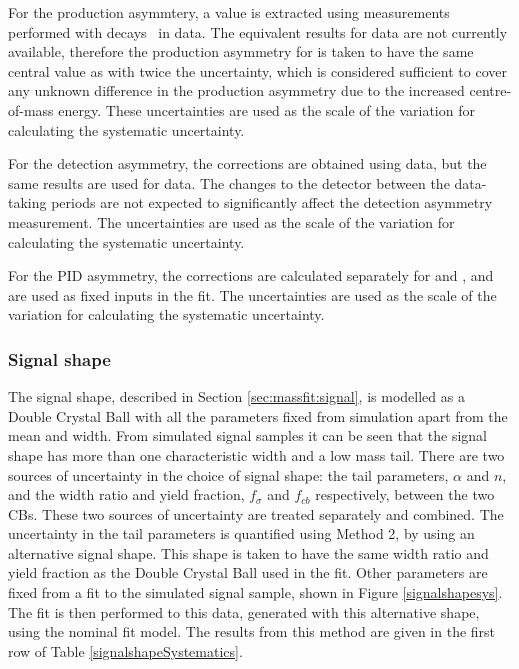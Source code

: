 For the production asymmtery, a \runone value is extracted using measurements performed with \decay{\Bp}{\Dzb\pip} decays~\cite{LHCb-PAPER-2016-054} in data. The equivalent results for \runtwo data are not currently available, therefore the production asymmetry for \runtwo is taken to have the same central value as \runone with twice the uncertainty, which is considered sufficient to cover any unknown difference in the production asymmetry due to the increased centre-of-mass energy. These uncertainties are used as the scale of the variation for calculating the systematic uncertainty.

For the detection asymmetry, the corrections are obtained using \runone data, but the same results are used for \runtwo data. The changes to the detector between the data-taking periods are not expected to significantly affect the detection asymmetry measurement. The uncertainties are used as the scale of the variation for calculating the systematic uncertainty.

For the PID asymmetry, the corrections are calculated separately for \runone and \runtwo, and are used as fixed inputs in the \CP fit. The uncertainties are used as the scale of the variation for calculating the systematic uncertainty.

\subsubsection{Signal shape}
\label{sec:systematics:signal}

The signal shape, described in Section \ref{sec:massfit:signal}, is modelled as a Double Crystal Ball with all the parameters fixed from simulation apart from the mean and width. From simulated signal samples it can be seen that the signal shape has more than one characteristic width and a low mass tail. There are two sources of uncertainty in the choice of signal shape: the tail parameters, $\alpha$ and $n$, and the width ratio and yield fraction, $f_{\sigma}$ and $f_{cb}$ respectively, between the two CBs. These two sources of uncertainty are treated separately and combined. The uncertainty in the tail parameters is quantified using Method 2, by using an alternative signal shape. This shape is taken to have the same width ratio and yield fraction as the Double Crystal Ball used in the \CP fit. Other parameters are fixed from a fit to the simulated signal sample, shown in Figure \ref{signalshapesys}. The \CP fit is then performed to this data, generated with this alternative shape, using the nominal fit model.  The results from this method are given in the first row of Table \ref{signalshapeSystematics}.

